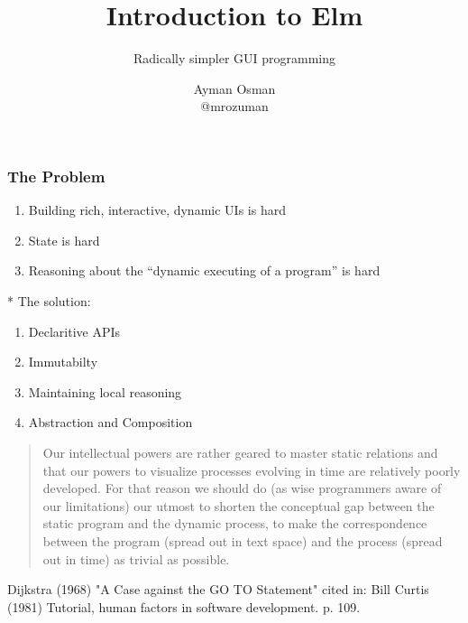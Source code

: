 \documentclass{beamer}
\title{Introduction to Elm}
\subtitle{Radically simpler GUI programming}
\author[Ayman Osman]{
  Ayman Osman
  \\ @mrozuman
}
\begin{document}
\begin{frame}
  \titlepage
\end{frame}


\begin{frame}
  \frametitle{The Problem}
  \begin{enumerate}
  \item Building rich, interactive, dynamic UIs is hard
  \item State is hard
  \item Reasoning about the ``dynamic executing of a program'' is hard
  \end{enumerate}

  \pause
* The solution:

\begin{enumerate}
\item Declaritive APIs
\item Immutabilty
\item Maintaining local reasoning
\item Abstraction and Composition
\end{enumerate}

\end{frame}

\begin{frame}
  
  \begin{quotation}
    Our intellectual powers are rather geared to master static relations and
that our powers to visualize processes evolving in time are relatively poorly
developed. For that reason we should do (as wise programmers aware of our
limitations) our utmost to shorten the conceptual gap between the static program
and the dynamic process, to make the correspondence between the program (spread
out in text space) and the process (spread out in time) as trivial as possible.
  \end{quotation}

  Dijkstra (1968) "A Case against the GO TO Statement" cited in: Bill Curtis
  (1981) Tutorial, human factors in software development. p. 109.
  
\end{frame}



\end{document}
